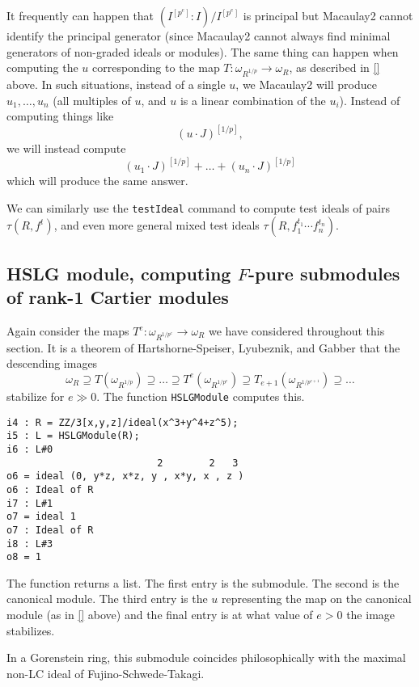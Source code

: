 \documentclass[11pt]{amsart}
\begin{document}
\begin{remark}
It frequently can happen that $(I^{[p^e]} : I)/I^{[p^e]}$ is principal but Macaulay2 cannot identify the principal generator (since Macaulay2 cannot always find minimal generators of non-graded ideals or modules).  The same thing can happen when computing the $u$ corresponding to the map $T : \omega_{R^{1/p}} \to \omega_R$, as described in \autoref{} above.  In such situations, instead of a single $u$, we Macaulay2 will produce $u_1, \dots, u_n$ (all multiples of $u$, and $u$ is a linear combination of the $u_i$).  Instead of computing things like
\[
(u \cdot J)^{[1/p]},
\]
we will instead compute
\[
(u_1 \cdot J)^{[1/p]} + \dots + (u_n \cdot J)^{[1/p]}
\]
which will produce the same answer.
\end{remark}

We can similarly use the {\tt testIdeal} command to compute test ideals of pairs $\tau(R, f^t)$, and even more general mixed test ideals $\tau(R, f_1^{t_1} \cdots f_n^{t_n})$.

\subsection{HSLG module, computing $F$-pure submodules of rank-1 Cartier modules}

Again consider the maps $T^e : \omega_{R^{1/p^e}} \to \omega_R$ we have considered throughout this section.  It is a theorem of Hartshorne-Speiser, Lyubeznik, and Gabber \cite{} that the descending images
\[
\omega_R \supseteq T(\omega_{R^{1/p}}) \supseteq \dots \supseteq T^e(\omega_{R^{1/p^e}}) \supseteq T_{e+1}(\omega_{R^{1/p^{e+1}}}) \supseteq \dots
\]
stabilize for $e \gg 0$.  The function {\tt HSLGModule} computes this.
\begin{verbatim}
i4 : R = ZZ/3[x,y,z]/ideal(x^3+y^4+z^5);
i5 : L = HSLGModule(R);
i6 : L#0
                          2        2   3
o6 = ideal (0, y*z, x*z, y , x*y, x , z )
o6 : Ideal of R
i7 : L#1
o7 = ideal 1
o7 : Ideal of R
i8 : L#3
o8 = 1
\end{verbatim}
The function returns a list.  The first entry is the submodule.  The second is the canonical module.  The third entry is the $u$ representing the map on the canonical module (as in \autoref{} above) and the final entry is at what value of $e > 0$ the image stabilizes.

In a Gorenstein ring, this submodule coincides philosophically with the maximal non-LC ideal of Fujino-Schwede-Takagi.
\end{document}
